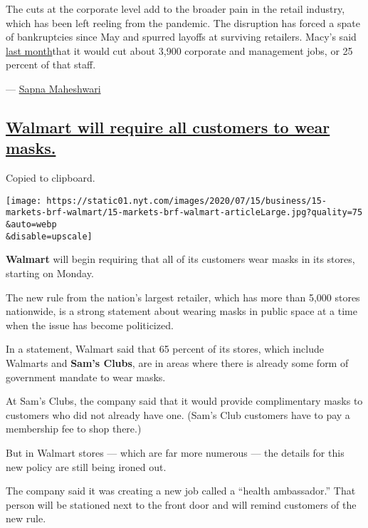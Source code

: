 The cuts at the corporate level add to the broader pain in the retail
industry, which has been left reeling from the pandemic. The disruption
has forced a spate of bankruptcies since May and spurred layoffs at
surviving retailers. Macy's said
\href{https://www.nytimes.com/2020/06/25/business/stock-market-today-coronavirus.html}{last
month}that it would cut about 3,900 corporate and management jobs, or 25
percent of that staff.

--- \href{https://www.nytimes.com/by/sapna-maheshwari}{Sapna Maheshwari}

\hypertarget{walmart-will-require-all-customers-to-wear-masks}{%
\subsection{\texorpdfstring{\protect\hyperlink{walmart-will-require-all-customers-to-wear-masks}{Walmart
will require all customers to wear
masks.}}{Walmart will require all customers to wear masks.}}\label{walmart-will-require-all-customers-to-wear-masks}}

Copied to clipboard.

\texttt{[image: https://static01.nyt.com/images/2020/07/15/business/15-markets-brf-walmart/15-markets-brf-walmart-articleLarge.jpg?quality=75\\\&auto=webp\\\&disable=upscale]}

\textbf{Walmart} will begin requiring that all of its customers wear
masks in its stores, starting on Monday.

The new rule from the nation's largest retailer, which has more than
5,000 stores nationwide, is a strong statement about wearing masks in
public space at a time when the issue has become politicized.

In a statement, Walmart said that 65 percent of its stores, which
include Walmarts and \textbf{Sam's Clubs}, are in areas where there is
already some form of government mandate to wear masks.

At Sam's Clubs, the company said that it would provide complimentary
masks to customers who did not already have one. (Sam's Club customers
have to pay a membership fee to shop there.)

But in Walmart stores --- which are far more numerous --- the details
for this new policy are still being ironed out.

The company said it was creating a new job called a ``health
ambassador.'' That person will be stationed next to the front door and
will remind customers of the new rule.

